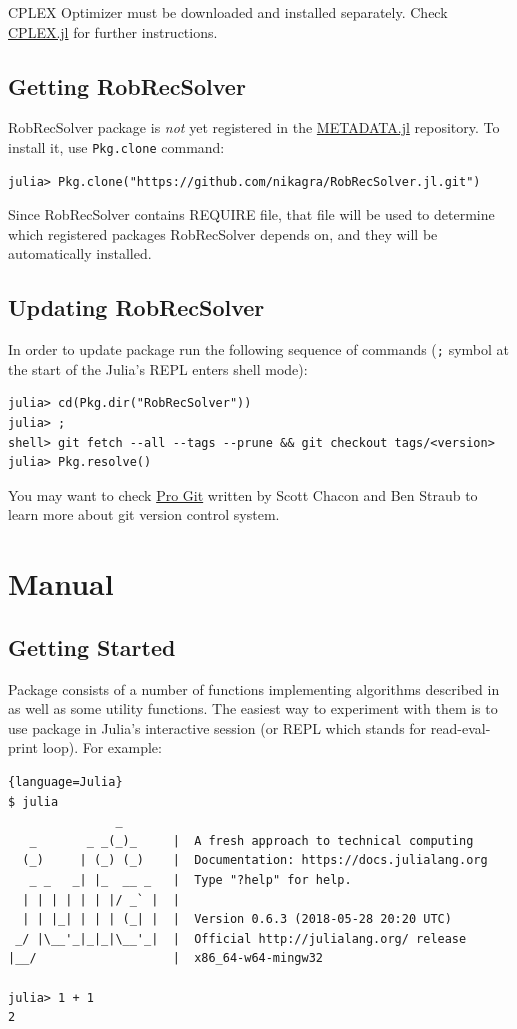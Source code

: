 CPLEX Optimizer must be downloaded and installed separately. Check \href{https://github.com/JuliaOpt/CPLEX.jl}{CPLEX.jl} for further instructions.

\subsection{Getting RobRecSolver}
RobRecSolver package is \textit{not} yet registered in the \href{https://github.com/JuliaLang/METADATA.jl}{METADATA.jl} repository. To install it, use \texttt{Pkg.clone} command:
\begin{lstlisting}
julia> Pkg.clone("https://github.com/nikagra/RobRecSolver.jl.git")
\end{lstlisting}

Since RobRecSolver contains REQUIRE file, that file will be used to determine which
registered packages RobRecSolver depends on, and they will be automatically installed.

\subsection{Updating RobRecSolver}
In order to update package run the following sequence of commands (\texttt{;} symbol
at the start of the Julia's REPL enters shell mode):
\begin{lstlisting}
julia> cd(Pkg.dir("RobRecSolver"))
julia> ;
shell> git fetch --all --tags --prune && git checkout tags/<version>
julia> Pkg.resolve()
\end{lstlisting}
You may want to check \href{https://git-scm.com/book/en/v2}{Pro Git} written by Scott Chacon and Ben Straub to learn more about git version control system.

\section{Manual}

\subsection{Getting Started}
Package consists of a number of functions implementing algorithms described in \cite{DBLP:journals/corr/abs-1811-06719} as well as some utility functions. The easiest way to experiment with them is to use package in Julia's interactive session (or REPL which stands for read-eval-print loop). For example:
\begin{lstlisting}{language=Julia}
$ julia
               _
   _       _ _(_)_     |  A fresh approach to technical computing
  (_)     | (_) (_)    |  Documentation: https://docs.julialang.org
   _ _   _| |_  __ _   |  Type "?help" for help.
  | | | | | | |/ _` |  |
  | | |_| | | | (_| |  |  Version 0.6.3 (2018-05-28 20:20 UTC)
 _/ |\__'_|_|_|\__'_|  |  Official http://julialang.org/ release
|__/                   |  x86_64-w64-mingw32

julia> 1 + 1
2
\end{lstlisting}

